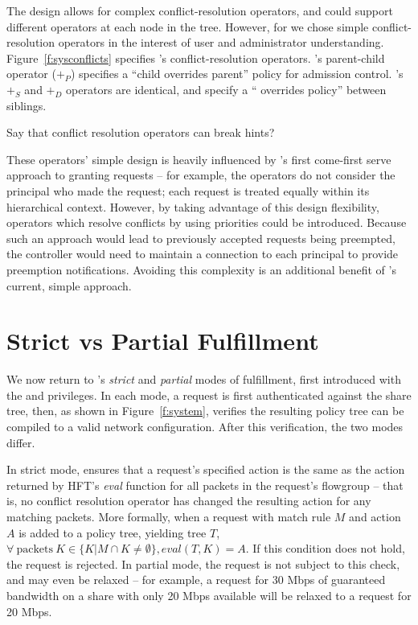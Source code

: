 The \treelang design allows for complex
conflict-resolution operators, and could support different operators at
each node in the tree.
However, for \sys we chose simple conflict-resolution operators in the
interest of user and administrator understanding.
Figure~\ref{f:sysconflicts} specifies \sys's conflict-resolution
operators.
\sys's parent-child operator ($+_P$) specifies a ``child
overrides parent'' policy for admission control. \sys's $+_S$ and $+_D$
operators are identical, and specify a `` overrides
 policy'' between siblings.

{\color{red} Say that conflict resolution operators can break hints?}

These operators' simple design is heavily influenced by \sys's
first come-first serve approach to granting requests -- for example,
the operators do not consider the principal who made the request;
each request is treated equally within its hierarchical context.
However, by taking advantage of this design flexibility, operators
which resolve conflicts by using priorities could be introduced.
Because such an approach would lead to previously accepted requests
being preempted, the \sys controller would need to maintain a
connection to each principal to provide preemption notifications.
Avoiding this complexity is an additional benefit of \sys's current,
simple approach.

\section{Strict vs Partial Fulfillment}
\label{sec:strict-partial}

We now return to \sys's \emph{strict} and \emph{partial} modes of
fulfillment, first introduced with the  and 
privileges. In each mode, a request is first authenticated against the
share tree, then, as shown in Figure~\ref{f:system}, \sys verifies the resulting policy tree can be
compiled to a valid network configuration.
After this verification, the two modes differ.

In strict mode, \sys ensures that a request's specified action
is the same as the action returned by HFT's \emph{eval}
function for all packets in the request's flowgroup -- that is, no
conflict resolution operator has changed the resulting action for
any matching packets.
More formally, when a request with match rule $M$ and action
$A$ is added to a policy tree, yielding tree $T$,
$\forall\ \mathrm{packets}\ K \in \{ K | M \cap K \ne \emptyset \}, \mathit{eval} (T, K) = A$.
If this condition does not hold, the request is rejected.
In partial mode, the request is not subject to this check, and may
even be relaxed -- for example, a request for 30 Mbps of guaranteed
bandwidth on a share with only 20 Mbps available will be relaxed
to a request for 20 Mbps. 

